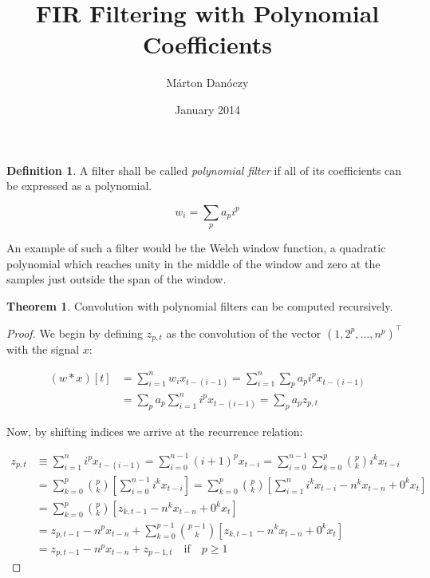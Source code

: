 \documentclass{article}
\title{FIR Filtering with Polynomial Coefficients}
\author{Márton Danóczy}
\date{January 2014}
\theoremstyle{definition}
\newtheorem*{definition}{Definition}
\newtheorem*{theorem}{Theorem}
\begin{document}
\maketitle

\begin{definition}
A filter shall be called \emph{polynomial filter} if all of its coefficients can be expressed as a polynomial.

\[ w_i = \sum_p a_p i^p \]

An example of such a filter would be the Welch window function, a quadratic polynomial which reaches unity in the middle of the window and zero at the samples just outside the span of the window.

\end{definition}

\begin{theorem}
Convolution with polynomial filters can be computed recursively.
\end{theorem}

\begin{proof}
We begin by defining $z_{p,t}$ as the convolution of the vector $(1, 2^p, \dots, n^p)^\top$ with the signal $x$:

\begin{align*}
(w*x)[t] &= \sum_{i=1}^n w_i x_{t-(i-1)}
    = \sum_{i=1}^n \sum_p a_p i^p x_{t-(i-1)} \\
    &= \sum_p a_p \sum_{i=1}^n i^p x_{t-(i-1)}
    = \sum_p a_p z_{p,t}
\end{align*}

Now, by shifting indices we arrive at the recurrence relation:

\begin{align*}
z_{p,t} &\equiv \sum_{i=1}^n i^p x_{t-(i-1)} = \sum_{i=0}^{n-1} (i+1)^p x_{t-i} = \sum_{i=0}^{n-1} \sum_{k=0}^{p} \binom{p}{k} i^k x_{t-i} \\
 &= \sum_{k=0}^{p} \binom{p}{k} \left[ \sum_{i=0}^{n-1} i^k x_{t-i} \right]
 = \sum_{k=0}^{p} \binom{p}{k} \left[ \sum_{i=1}^{n} i^k x_{t-i} - n^k x_{t-n} + 0^k x_t\right] \\
 &= \sum_{k=0}^{p} \binom{p}{k} \left[ z_{k,t-1} - n^k x_{t-n} + 0^k x_t\right] \\
 &= z_{p,t-1} - n^p x_{t-n} + \sum_{k=0}^{p-1} \binom{p-1}{k} \left[ z_{k,t-1} - n^k x_{t-n} + 0^k x_t\right] \\
 &= z_{p,t-1} - n^p x_{t-n} + z_{p-1,t} \quad\mathrm{if}\quad p \geq 1
\end{align*}

\end{proof}
\end{document}
